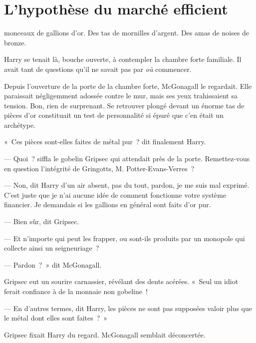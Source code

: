 \chapter[L'hypothèse du marché efficient]{L'hypothèse du marché efficient\protect\footnotemark}

 monceaux de gallions d'or. Des tas de mornilles d'argent. Des amas de noises de bronze.

\hplettrineextrapara
Harry se tenait là, bouche ouverte, à contempler la chambre forte familiale. Il avait tant de questions qu'il ne savait pas par \emph{où} commencer.

Depuis l'ouverture de la porte de la chambre forte, McGonagall le regardait. Elle paraissait négligemment adossée contre le mur, mais ses yeux trahissaient sa tension. Bon, rien de surprenant. Se retrouver plongé devant un énorme tas de pièces d'or constituait un test de personnalité si épuré que c'en était un archétype.

«~Ces pièces sont-elles faites de métal pur~? dit finalement Harry.

--- Quoi~? siffla le gobelin Gripsec qui attendait près de la porte. Remettez-vous en question l'intégrité de Gringotts, M.  Potter-Evans-Verres~?

--- Non, dit Harry d'un air absent, pas du tout, pardon, je me suis mal exprimé. C'est juste que je n'ai aucune idée de comment fonctionne votre système financier. Je demandais si les gallions en général sont faits d'or pur.

--- Bien sûr, dit Gripsec.

--- Et n'importe qui peut les frapper, ou sont-ils produits par un monopole qui collecte ainsi un seigneuriage~?

--- Pardon~?~» dit McGonagall.

Gripsec eut un sourire carnassier, révélant des dents acérées. «~Seul un idiot ferait confiance à de la monnaie non gobeline~!

--- En d'autres termes, dit Harry, les pièces ne sont pas supposées valoir plus que le métal dont elles sont faites~?~»

Gripsec fixait Harry du regard. McGonagall semblait déconcertée.

